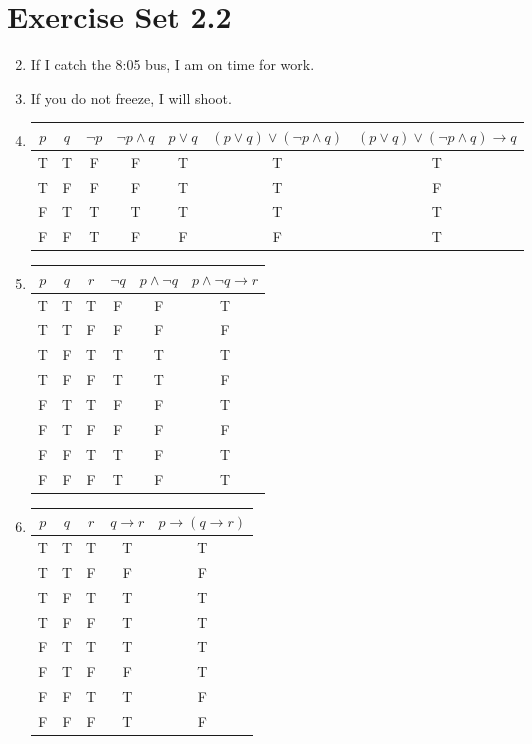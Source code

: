 \documentclass[12pt]{article}
\begin{document}
\section*{Exercise Set 2.2}
\begin{enumerate}
\setcounter{enumi}{1}
\item %
If I catch the 8:05 bus, I am on time for work.
\item %
If you do not freeze, I will shoot.
\setcounter{enumi}{5} %
\item
\begin{tabular} {|c|c||c|c|c|c|c|}
\hline
$p$ & $q$ & $\neg p$ & $\neg p \wedge q$ & $p \vee q$ & $(p \vee q) \vee (\neg p \wedge q)$ & $(p \vee q) \vee
(\neg p \wedge q) \rightarrow q$\\ \hline
T & T & F & F & T & T & T\\
T & F & F & F & T & T & F\\
F & T & T & T & T & T & T\\
F & F & T & F & F & F & T\\ \hline
\end{tabular}

\item %
\begin{tabular} {|c|c|c||c|c|c|}
\hline
$p$ & $q$ & $r$ & $\neg q$ & $p \wedge \neg q$ & $p \wedge \neg q \rightarrow r$\\ \hline
T & T & T & F & F & T\\
T & T & F & F & F & F\\
T & F & T & T & T & T\\
T & F & F & T & T & F\\
F & T & T & F & F & T\\
F & T & F & F & F & F\\
F & F & T & T & F & T\\
F & F & F & T & F & T\\ \hline
\end{tabular}

\setcounter{enumi}{14} %
\item

\begin{tabular} {|c|c|c||c|c|}
\hline
$p$ & $q$ & $r$ & $q \rightarrow r$ & $p \rightarrow (q \rightarrow r)$\\ \hline
T & T & T & T & T\\
T & T & F & F & F\\
T & F & T & T & T\\
T & F & F & T & T\\
F & T & T & T & T\\
F & T & F & F & T\\
F & F & T & T & F\\
F & F & F & T & F\\ \hline
\end{tabular}


\end{enumerate}
\end{document}
